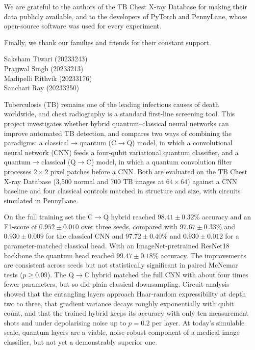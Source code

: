 \documentclass{mnnit}
\newcommand{\cq}{C$\rightarrow$Q}
\newcommand{\qc}{Q$\rightarrow$C}
\begin{document}
We are grateful to the authors of the TB Chest X-ray Database for making
their data publicly available, and to the developers of PyTorch and
PennyLane, whose open-source software was used for every experiment.

Finally, we thank our families and friends for their constant support.

\vspace{1cm}
\begin{flushright}
Saksham Tiwari (20233243)\\
Prajjwal Singh (20233213)\\
Madipelli Rithvik (20233176)\\
Sanchari Ray (20233250)
\end{flushright}

Tuberculosis (TB) remains one of the leading infectious causes of death
worldwide, and chest radiography is a standard first-line screening tool.
This project investigates whether hybrid quantum--classical neural networks
can improve automated TB detection, and compares two ways of combining the
paradigms: a classical$\rightarrow$quantum (\cq) model, in which a
convolutional neural network (CNN) feeds a four-qubit variational quantum
classifier, and a quantum$\rightarrow$classical (\qc) model, in which a
quantum convolution filter processes $2\times2$ pixel patches before a CNN.
Both are evaluated on the TB Chest X-ray Database (3,500 normal and 700 TB
images at $64\times64$) against a CNN baseline and four classical controls
matched in structure and size, with circuits simulated in PennyLane.

On the full training set the \cq{} hybrid reached $98.41 \pm 0.32\%$
accuracy and an F1-score of $0.952 \pm 0.010$ over three seeds, compared with
$97.67 \pm 0.33\%$ and $0.930 \pm 0.009$ for the classical CNN and
$97.72 \pm 0.40\%$ and $0.930 \pm 0.012$ for a parameter-matched classical
head. With an ImageNet-pretrained ResNet18 backbone the quantum head reached
$99.47 \pm 0.18\%$ accuracy. The improvements are consistent across seeds
but not statistically significant in paired McNemar tests ($p \geq 0.09$).
The \qc{} hybrid matched the full CNN with about four times fewer
parameters, but so did plain classical downsampling. Circuit analysis
showed that the entangling layers approach Haar-random
expressibility at depth two to three, that gradient variance decays roughly
exponentially with qubit count, and that the trained hybrid keeps its
accuracy with only ten measurement shots and under depolarising noise up to
$p = 0.2$ per layer. At today's simulable scale, quantum layers are a
viable, noise-robust component of a medical image classifier, but not yet a
demonstrably superior one.
\end{document}
